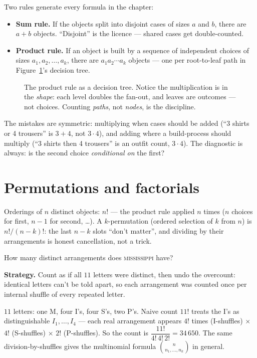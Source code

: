 Two rules generate every formula in the chapter:
\begin{itemize}
\item \textbf{Sum rule.} If the objects split into disjoint cases of sizes
$a$ and $b$, there are $a + b$ objects. ``Disjoint'' is the licence ---
shared cases get double-counted.
\item \textbf{Product rule.} If an object is built by a sequence of
independent choices of sizes $a_1, a_2, \dots, a_k$, there are
$a_1 a_2 \cdots a_k$ objects --- one per root-to-leaf path in
Figure~\ref{fig:dectree}'s decision tree.
\end{itemize}

\begin{figure}[ht]\centering

\caption{The product rule as a decision tree. Notice the multiplication
is in the \emph{shape}: each level doubles the fan-out, and leaves are
outcomes --- not choices. Counting \emph{paths}, not \emph{nodes}, is the
discipline.}
\label{fig:dectree}
\end{figure}

The mistakes are symmetric: multiplying when cases should be added
(``3 shirts or 4 trousers'' is $3+4$, not $3\cdot4$), and adding where a
build-process should multiply (``3 shirts then 4 trousers'' is an outfit
count, $3\cdot4$). The diagnostic is always: is the second choice
\emph{conditional on} the first?

\section{Permutations and factorials}\label{sec:perms}

Orderings of $n$ distinct objects: $n!$ --- the product rule applied
$n$ times ($n$ choices for first, $n-1$ for second, \dots). A
$k$-permutation (ordered selection of $k$ from $n$) is
$n!/(n-k)!$: the last $n-k$ slots ``don't matter'', and dividing by
their arrangements is honest cancellation, not a trick.

\begin{example}\label{ex:mississippi}
How many distinct arrangements does \textsc{mississippi} have?
\par\smallskip
\textbf{Strategy.} Count as if all $11$ letters were distinct, then undo
the overcount: identical letters can't be told apart, so each arrangement
was counted once per internal shuffle of every repeated letter.
\par\smallskip
\begin{solution}
$11$ letters: one M, four I's, four S's, two P's. Naive count $11!$
treats the I's as distinguishable $I_1, \dots, I_4$ --- each real
arrangement appears $4!$ times (I-shuffles) $\times$ $4!$ (S-shuffles)
$\times$ $2!$ (P-shuffles). So the count is
$\dfrac{11!}{4!\,4!\,2!} = 34\,650$. The same division-by-shuffles gives
the multinomial formula $\binom{n}{n_1,\dots,n_k}$ in general.
\end{solution}
\end{example}


